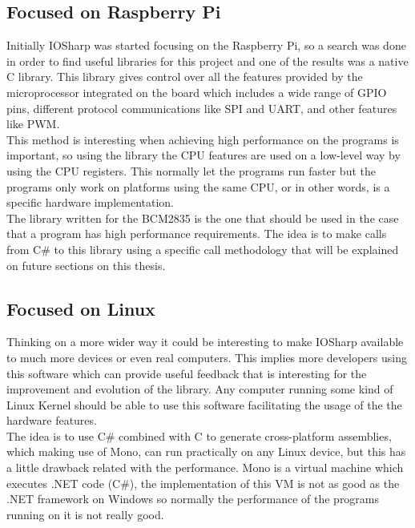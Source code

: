 \subsection{Focused on Raspberry Pi}\label{SS:IOSharp-RPI}
Initially IOSharp was started focusing on the Raspberry Pi, so a search was done in order to find useful libraries for this project and one of the results was a native C library. This library gives control over all the features provided by the microprocessor integrated on the board which includes a wide range of \gls{GPIO} pins, different protocol communications like \gls{SPI} and \gls{UART}, and other features like \gls{PWM}.
\\
This method is interesting when achieving high performance on the programs is important, so using the library the CPU features are used on a low-level way by using the CPU registers. This normally let the programs run faster but the programs only work on platforms using the same CPU, or in other words, is a specific hardware implementation.
\\
The library written for the \gls{BCM2835} is the one that should be used in the case that a program has high performance requirements. The idea is to make calls from C\# to this library using a specific call methodology that will be explained on future sections on this thesis.

\subsection{Focused on Linux}\label{SS:IOSharp-Linux}
Thinking on a more wider way it could be interesting to make IOSharp available to much more devices or even real computers. This implies more developers using this software which can provide useful feedback that is interesting for the improvement and evolution of the library. Any computer running some kind of Linux Kernel should be able to use this software facilitating the usage of the the hardware features.
\\
The idea is to use C\# combined with C to generate cross-platform assemblies, which making use of Mono, can run practically on any Linux device, but this has a little drawback related with the performance. Mono is a virtual machine which executes .NET code (C\#), the implementation of this VM is not as good as the .NET framework on Windows so normally the performance of the programs running on it is not really good.

